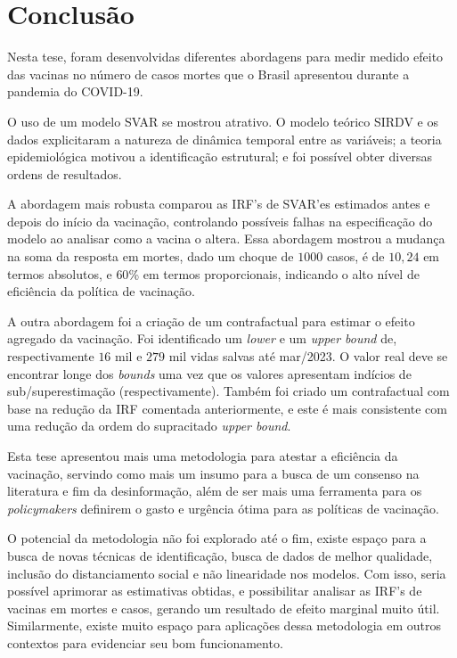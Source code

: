 \documentclass[
    article,
	12pt,				%
	oneside,			%
	a4paper,			%
	english,			%
	brazil,				%
	hyperref = {colorlinks, citecolor=c1d, linkcolor=c2d, urlcolor=c3d, colorlinks}
	]{abntex2}
\begin{document}
\let\clearpage\relax
\chapter{Conclusão}

Nesta tese, foram desenvolvidas diferentes abordagens para medir medido efeito das vacinas no número de casos mortes que o Brasil apresentou durante a pandemia do COVID-19.

O uso de um modelo SVAR se mostrou atrativo. O modelo teórico SIRDV e os dados explicitaram a natureza de dinâmica temporal entre as variáveis; a teoria epidemiológica motivou a identificação estrutural; e foi possível obter diversas ordens de resultados.

A abordagem mais robusta comparou as IRF's de SVAR'es estimados antes e depois do início da vacinação, controlando possíveis falhas na especificação do modelo ao analisar como a vacina o altera. Essa abordagem mostrou a mudança na soma da resposta em mortes, dado um choque de $1000$ casos, é de $10,24$ em termos absolutos, e $60$\% em termos proporcionais, indicando o alto nível de eficiência da política de vacinação.

A outra abordagem foi a criação de um contrafactual para estimar o efeito agregado da vacinação. Foi identificado um \textit{lower} e um \textit{upper bound} de, respectivamente $16$ mil e $279$ mil vidas salvas até mar/2023. O valor real deve se encontrar longe dos \textit{bounds} uma vez que os valores apresentam indícios de sub/superestimação (respectivamente). Também foi criado um contrafactual com base na redução da IRF comentada anteriormente, e este é mais consistente com uma redução da ordem do supracitado \textit{upper bound}.

Esta tese apresentou mais uma metodologia para atestar a eficiência da vacinação, servindo como mais um insumo para a busca de um consenso na literatura e fim da desinformação, além de ser mais uma ferramenta para os \textit{policymakers} definirem o gasto e urgência ótima para as políticas de vacinação.

O potencial da metodologia não foi explorado até o fim, existe espaço para a busca de novas técnicas de identificação, busca de dados de melhor qualidade, inclusão do distanciamento social e não linearidade nos modelos. Com isso, seria possível aprimorar as estimativas obtidas, e possibilitar analisar as IRF's de vacinas em mortes e casos, gerando um resultado de efeito marginal muito útil. Similarmente, existe muito espaço para aplicações dessa metodologia em outros contextos para evidenciar seu bom funcionamento.
\end{document}

